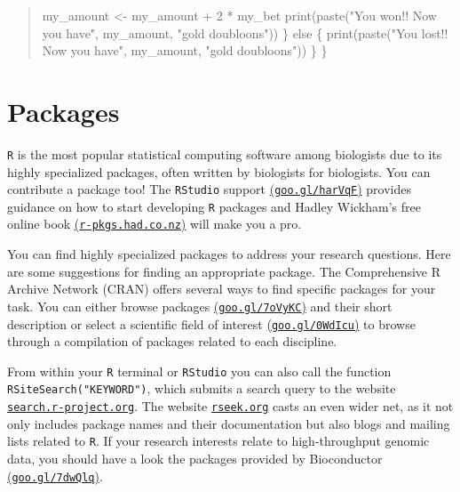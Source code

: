 \documentclass[
  letterpaper,
  DIV=11,
  numbers=noendperiod]{scrreprt}
\newenvironment{Shaded}{\begin{snugshade}}{\end{snugshade}}
\newcommand{\ControlFlowTok}[1]{\textcolor[rgb]{0.00,0.23,0.31}{#1}}
\newcommand{\DecValTok}[1]{\textcolor[rgb]{0.68,0.00,0.00}{#1}}
\newcommand{\FunctionTok}[1]{\textcolor[rgb]{0.28,0.35,0.67}{#1}}
\newcommand{\NormalTok}[1]{\textcolor[rgb]{0.00,0.23,0.31}{#1}}
\newcommand{\OtherTok}[1]{\textcolor[rgb]{0.00,0.23,0.31}{#1}}
\newcommand{\SpecialCharTok}[1]{\textcolor[rgb]{0.37,0.37,0.37}{#1}}
\newcommand{\StringTok}[1]{\textcolor[rgb]{0.13,0.47,0.30}{#1}}
\begin{document}
\begin{quote}
\begin{Shaded}
\begin{Highlighting}[]
\NormalTok{    my\_amount }\OtherTok{\textless{}{-}}\NormalTok{ my\_amount }\SpecialCharTok{+} \DecValTok{2} \SpecialCharTok{*}\NormalTok{ my\_bet}
    \FunctionTok{print}\NormalTok{(}\FunctionTok{paste}\NormalTok{(}\StringTok{"You won!! Now you have"}\NormalTok{, my\_amount, }\StringTok{"gold doubloons"}\NormalTok{))}
\NormalTok{  \} }\ControlFlowTok{else}\NormalTok{ \{}
    \FunctionTok{print}\NormalTok{(}\FunctionTok{paste}\NormalTok{(}\StringTok{"You lost!! Now you have"}\NormalTok{, my\_amount, }\StringTok{"gold doubloons"}\NormalTok{))}
\NormalTok{  \}}
\NormalTok{\}}
\end{Highlighting}
\end{Shaded}
\end{quote}

\hypertarget{packages}{%
\section{Packages}\label{packages}}

\texttt{R} is the most popular statistical computing software among
biologists due to its highly specialized packages, often written by
biologists for biologists. You can contribute a package too! The
\texttt{RStudio} support
\href{http://goo.gl/harVqF}{(\texttt{goo.gl/harVqF})} provides guidance
on how to start developing \texttt{R} packages and Hadley Wickham's free
online book \href{http://r-pkgs.had.co.nz}{(\texttt{r-pkgs.had.co.nz})}
will make you a pro.

You can find highly specialized packages to address your research
questions. Here are some suggestions for finding an appropriate package.
The Comprehensive R Archive Network (CRAN) offers several ways to find
specific packages for your task. You can either browse packages
\href{http://goo.gl/7oVyKC}{(\texttt{goo.gl/7oVyKC})} and their short
description or select a scientific field of interest
\href{http://goo.gl/0WdIcu}{(\texttt{goo.gl/0WdIcu})} to browse through
a compilation of packages related to each discipline.

From within your \texttt{R} terminal or \texttt{RStudio} you can also
call the function \texttt{RSiteSearch("KEYWORD")}, which submits a
search query to the website
\href{http://search.r-project.org}{\texttt{search.r-project.org}}. The
website \href{http://rseek.org}{\texttt{rseek.org}} casts an even wider
net, as it not only includes package names and their documentation but
also blogs and mailing lists related to \texttt{R}. If your research
interests relate to high-throughput genomic data, you should have a look
the packages provided by Bioconductor
\href{http://goo.gl/7dwQlq}{(\texttt{goo.gl/7dwQlq})}.
\end{document}

